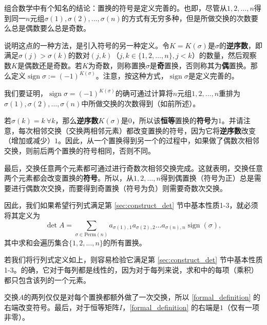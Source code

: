 组合数学中有个知名的结论：置换的符号是定义完善的。也即，尽管从$1,2,\ldots,n$得到同一$n$元组$\sigma(1),\sigma(2),\dots,\sigma(n)$的方式有无穷多种，但是所做交换的次数要么总是偶数要么总是奇数。

说明这点的一种方法，是引入符号的另一种定义。令$K=K(\sigma)$是$\sigma$的\textbf{逆序数}，即满足$\sigma(j)>\sigma(k)$的数对$(j,k)$（$j,k\in \{1,2,\dots,n\},j<k$）的数量，然后观察数$K$是偶数还是奇数。若$K$为奇数，则称置换$\sigma$是\textbf{奇}置换，否则称其为\textbf{偶}置换。那么定义$\operatorname{sign}\sigma:=(-1)^{K(\sigma)}$。注意，按这种方式，$\operatorname{sign}\sigma$是定义完善的。

我们要证明，$\operatorname{sign}\sigma=(-1)^{K(\sigma)}$的确可通过计算将$n$元组$1,2,\ldots,n$重排为$\sigma(1),\sigma(2),\dots,\sigma(n)$中所做交换的次数得到（如前所述）。

若$\sigma(k)=k\ \forall k$，那么\textbf{逆序数}$K(\sigma)$是$0$，所以该\textbf{恒等}置换的\textbf{符号}为$1$。并请注意，每次相邻交换（交换两相邻元素）都改变置换的符号，因为它将\textbf{逆序数}改变（增加或减少）$1$。因此，从一个置换得到另一个的过程中，如果做了偶数次相邻交换，则前后两个置换的符号相同，否则不同。

最后，交换任意两个元素都可通过进行奇数次相邻交换完成。这就表明，交换任意两个元素都会改变置换的\textbf{符号}。所以，从$1,2,\ldots,n$得到偶置换（符号为正）总是需要进行偶数次交换，而要得到奇置换（符号为负）则需要奇数次交换。

因此，我们如果希望行列式满足第 \ref{sec:construct_det} 节中基本性质1-3，就必须将其定义为
\begin{equation}\label{formal_definition}
  \det A=\sum_{\sigma\in\mathrm{Perm}(n)}a_{\sigma(1),1}a_{\sigma(2),2}\ldots a_{\sigma(n),n}\operatorname{sign}(\sigma),
\end{equation}
其中求和会遍历集合$\{1,2,\dots,n\}$的所有置换。

若我们将行列式定义如上，则容易检验它满足第 \ref{sec:construct_det} 节中基本性质1-3。的确，它对于每列都是线性的，因为对于每列来说，求和中的每项（乘积）都只包含该列的一个元素。

交换$A$的两列仅仅是对每个置换都额外做了一次交换，所以 \eqref{formal_definition} 的右端改变符号。最后，对于恒等矩阵$I$，\eqref{formal_definition} 的右端是$1$（仅有一项非零）。

